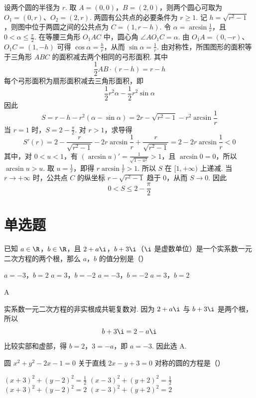 \begin{solution}
设两个圆的半径为 \(r\). 取 \(A=(0,0)\)，\(B=(2,0)\)，则两个圆心可取为 \(O_{1}=(0,r)\)、\(O_{2}=(2,r)\). 两圆有公共点的必要条件为 \(r\geqslant1\). 记 \(h=\sqrt{r^2-1}\)，则图中位于两圆之间的公共点为 \(C=(1,r-h)\). 令 \(\alpha=\arcsin\frac{1}{r}\)，且 \(0<\alpha\leqslant\frac{\pi}{2}\).
在等腰三角形 \(O_{1}AC\) 中，圆心角 \(\angle AO_{1}C=\alpha\). 由 \(O_{1}A=(0,-r)\)、\(O_{1}C=(1,-h)\) 可得 \(\cos\alpha=\frac{h}{r}\)，从而 \(\sin\alpha=\frac{1}{r}\). 由对称性，所围图形的面积等于三角形 \(ABC\) 的面积减去两个相同的弓形面积. 其中
\[
\frac{1}{2}AB\cdot(r-h)=r-h
\]
每个弓形面积为扇形面积减去三角形面积，即
\[
\frac{1}{2}r^2\alpha-\frac{1}{2}r^2\sin\alpha
\]
因此
\[
S=r-h-r^2\left(\alpha-\sin\alpha\right)=2r-\sqrt{r^2-1}-r^2\arcsin\frac{1}{r}
\]
当 \(r=1\) 时，\(S=2-\frac{\pi}{2}\). 对 \(r>1\)，求导得
\[
S'(r)=2-\frac{r}{\sqrt{r^2-1}}-2r\arcsin\frac{1}{r}+\frac{r}{\sqrt{r^2-1}}=2-2r\arcsin\frac{1}{r}<0
\]
其中，对 \(0<u<1\)，有 \((\arcsin u)'=\frac{1}{\sqrt{1-u^2}}>1\)，且 \(\arcsin0=0\)，所以 \(\arcsin u>u\). 取 \(u=\frac{1}{r}\)，即得 \(r\arcsin\frac{1}{r}>1\). 所以 \(S\) 在 \([1,+\infty)\) 上递减. 当 \(r\to+\infty\) 时，公共点 \(C\) 的纵坐标 \(r-\sqrt{r^2-1}\) 趋于 \(0\)，从而 \(S\to0\). 因此
\[
0<S\leqslant2-\frac{\pi}{2}
\]
\end{solution}

\section{单选题}

\begin{problem}
已知 \(a\in\R\)，\(b\in\R\)，且 \(2 + a\i\)，\(b + 3\i\)（\(\i\) 是虚数单位）是一个实系数一元二次方程的两个根，那么 \(a\)，\(b\) 的值分别是（\quad）

\choices
    {\(a=-3\)，\(b=2\)}
    {\(a=3\)，\(b=-2\)}
    {\(a=-3\)，\(b=-2\)}
    {\(a=3\)，\(b=2\)}
\end{problem}

\begin{answer}
A
\end{answer}

\begin{solution}
实系数一元二次方程的非实根成共轭复数对. 因为 \(2+a\i\) 与 \(b+3\i\) 是两个根，所以
\[
b+3\i=2-a\i
\]
比较实部和虚部，得 \(b=2\)，\(3=-a\)，即 \(a=-3\). 因此选 A.
\end{solution}

\begin{problem}
圆 \(x^{2} + y^{2} - 2x - 1 = 0\) 关于直线 \(2x - y + 3 = 0\) 对称的圆的方程是（\quad）

\choices
    {\((x + 3)^2 + (y - 2)^2 = \frac{1}{2}\)}
    {\((x - 3)^2 + (y + 2)^2 = \frac{1}{2}\)}
    {\((x + 3)^2 + (y - 2)^2 = 2\)}
    {\((x - 3)^2 + (y + 2)^2 = 2\)}
\end{problem}

